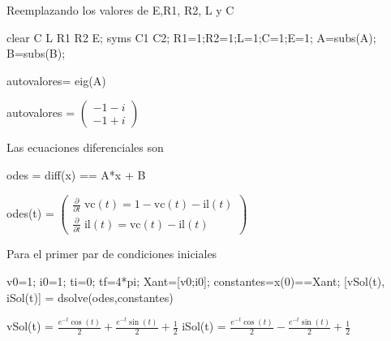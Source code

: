\documentclass[10pt,a4paper]{article} %
\begin{document}
\begin{par}
	\begin{flushleft}
		Reemplazando los valores de E,R1, R2, L y C
	\end{flushleft}
\end{par}

\begin{matlabcode}
	clear C L R1 R2 E;
	syms C1 C2;
	R1=1;R2=1;L=1;C=1;E=1;
	A=subs(A);
	B=subs(B);
\end{matlabcode}


\begin{matlabcode}
	autovalores= eig(A)
\end{matlabcode}
\begin{matlabsymbolicoutput}
	autovalores = 
	$\displaystyle \left(\begin{array}{c}
	-1-i\\
	-1+i
	\end{array}\right)$
\end{matlabsymbolicoutput}

\begin{par}
	\begin{flushleft}
		Las ecuaciones diferenciales son
	\end{flushleft}
\end{par}

\begin{matlabcode}
	odes = diff(x) == A*x + B
\end{matlabcode}
\begin{matlabsymbolicoutput}
	odes(t) = 
	$\displaystyle \left(\begin{array}{c}
	\frac{\partial }{\partial t}\;\textrm{vc}\left(t\right)=1-\textrm{vc}\left(t\right)-\textrm{il}\left(t\right)\\
	\frac{\partial }{\partial t}\;\textrm{il}\left(t\right)=\textrm{vc}\left(t\right)-\textrm{il}\left(t\right)
	\end{array}\right)$
\end{matlabsymbolicoutput}


\begin{par}
	\begin{flushleft}
		Para el primer par de condiciones iniciales
	\end{flushleft}
\end{par}

\begin{matlabcode}
	v0=1;
	i0=1;
	ti=0;
	tf=4*pi;
	Xant=[v0;i0];
	constantes=x(0)==Xant;
	[vSol(t), iSol(t)] = dsolve(odes,constantes)
\end{matlabcode}
\begin{matlabsymbolicoutput}
	vSol(t) = 
	$\displaystyle \frac{e^{-t}  \cos \left(t\right)}{2}+\frac{e^{-t}  \sin \left(t\right)}{2}+\frac{1}{2}$
	iSol(t) = 
	$\displaystyle \frac{e^{-t}  \cos \left(t\right)}{2}-\frac{e^{-t}  \sin \left(t\right)}{2}+\frac{1}{2}$
\end{matlabsymbolicoutput}
\end{document}
